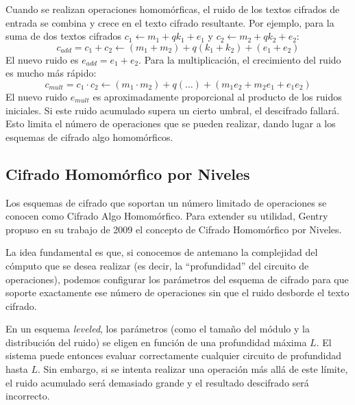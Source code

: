 Cuando se realizan operaciones homomórficas, el ruido de los textos cifrados de entrada se combina y crece en el texto cifrado resultante. Por ejemplo, para la suma de dos textos cifrados $c_1 \leftarrow m_1 + qk_1 + e_1$ y $c_2 \leftarrow m_2 + qk_2 + e_2$:
\begin{equation}
    c_{add} = c_1 + c_2 \leftarrow (m_1+m_2) + q(k_1+k_2) + (e_1+e_2)
\end{equation}
El nuevo ruido es $e_{add} = e_1 + e_2$. Para la multiplicación, el crecimiento del ruido es mucho más rápido:
\begin{equation}
    c_{mult} = c_1 \cdot c_2 \leftarrow (m_1 \cdot m_2) + q(\dots) + (m_1 e_2 + m_2 e_1 + e_1 e_2)
\end{equation}
El nuevo ruido $e_{mult}$ es aproximadamente proporcional al producto de los ruidos iniciales. Si este ruido acumulado supera un cierto umbral, el descifrado fallará. Esto limita el número de operaciones que se pueden realizar, dando lugar a los esquemas de cifrado algo homomórficos. 


\subsection{Cifrado Homomórfico por Niveles}\label{sec:leveled_fhe}

Los esquemas de cifrado que soportan un número limitado de operaciones se conocen como Cifrado Algo Homomórfico. Para extender su utilidad, Gentry propuso en su trabajo de 2009 \cite{Gentry09} el concepto de Cifrado Homomórfico por Niveles.

La idea fundamental es que, si conocemos de antemano la complejidad del cómputo que se desea realizar (es decir, la ``profundidad'' del circuito de operaciones), podemos configurar los parámetros del esquema de cifrado para que soporte exactamente ese número de operaciones sin que el ruido desborde el texto cifrado.

En un esquema \textit{leveled}, los parámetros (como el tamaño del módulo y la distribución del ruido) se eligen en función de una profundidad máxima $L$. El sistema puede entonces evaluar correctamente cualquier circuito de profundidad hasta $L$. Sin embargo, si se intenta realizar una operación más allá de este límite, el ruido acumulado será demasiado grande y el resultado descifrado será incorrecto.

